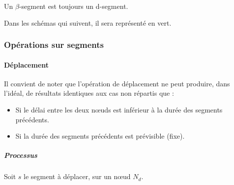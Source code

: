Un $\beta$-segment est toujours un d-segment.

Dans les schémas qui suivent, il sera représenté en \textcolor{OliveGreen}{vert}.
\subsubsection{Opérations sur segments}
\paragraph{Déplacement}

Il convient de noter que l'opération de déplacement ne peut produire, dans l'idéal, de résultats identiques aux cas non répartis que : 
\begin{itemize}
\item Si le délai entre les deux nœuds est inférieur à la durée des segments précédents.
\item Si la durée des segments précédents est prévisible (fixe).
\end{itemize} 

\subparagraph{Processus}
Soit $s$ le segment à déplacer, sur un nœud $N_d$.

